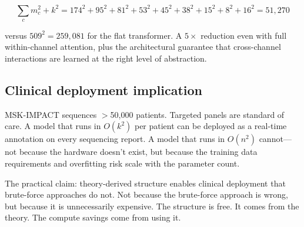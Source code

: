 \begin{equation}
\sum_c m_c^2 + k^2 = 174^2 + 95^2 + 81^2 + 53^2 + 45^2
+ 38^2 + 15^2 + 8^2 + 16^2
= 51{,}270
\end{equation}

versus $509^2 = 259{,}081$ for the flat transformer.
A $5\times$ reduction even with full within-channel attention,
plus the architectural guarantee that cross-channel interactions
are learned at the right level of abstraction.

\subsection{Clinical deployment implication}

MSK-IMPACT sequences $>$50{,}000 patients. Targeted panels are
standard of care. A model that runs in $O(k^2)$ per patient can
be deployed as a real-time annotation on every sequencing report.
A model that runs in $O(n^2)$ cannot---not because the hardware
doesn't exist, but because the training data requirements and
overfitting risk scale with the parameter count.

The practical claim: theory-derived structure enables clinical
deployment that brute-force approaches do not. Not because the
brute-force approach is wrong, but because it is unnecessarily
expensive. The structure is free. It comes from the theory.
The compute savings come from using it.
